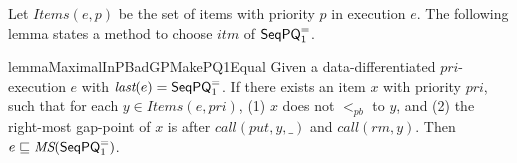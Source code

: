 Let $\textit{Items}(e,p)$ be the set of items with priority $p$ in execution $e$. The following lemma states a method to choose $\textit{itm}$ of $\mathsf{SeqPQ}_1^{=}$.

\begin{restatable}{lemma}{MaximalInPBadGPMakePQ1Equal}
\label{lemma:maximal in pb and gap-point make a candidate of EPQ1Equal}
Given a data-differentiated $\textit{pri}$-execution $e$ with $\textit{last}(e) = \mathsf{SeqPQ}_1^{=}$. If there exists an item $x$ with priority $\textit{pri}$, such that for each $y \in \textit{Items}(e,\textit{pri})$, (1) $x$ does not $<_{\textit{pb}}$ to $y$, and (2) the right-most gap-point of $x$ is after $\textit{call}(\textit{put},y,\_)$ and $\textit{call}(\textit{rm},y)$. Then $e \sqsubseteq \textit{MS}(\mathsf{SeqPQ}_1^{=})$.
\end{restatable}

